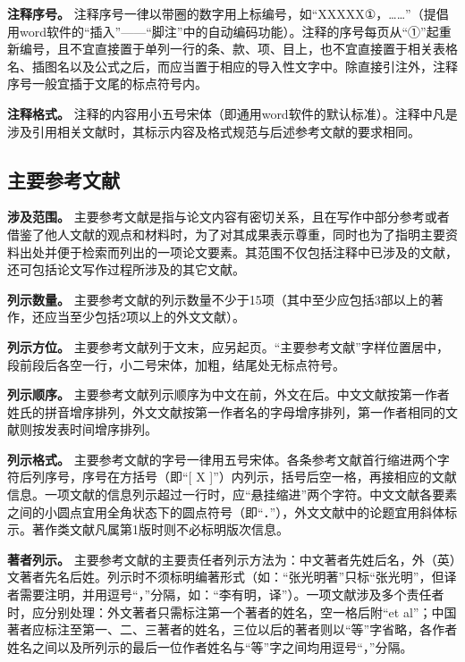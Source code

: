 \documentclass[doublesided]{Style/ucasthesis}%
\begin{document}
\textbf{注释序号。} 注释序号一律以带圈的数字用上标编号，如``XXXXX①，\ldots{}\ldots{}''（提倡用word软件的``插入''------``脚注''中的自动编码功能）。注释的序号每页从``①''起重新编号，且不宜直接置于单列一行的条、款、项、目上，也不宜直接置于相关表格名、插图名以及公式之后，而应当置于相应的导入性文字中。除直接引注外，注释序号一般宜插于文尾的标点符号内。

\textbf{注释格式。} 注释的内容用小五号宋体（即通用word软件的默认标准）。注释中凡是涉及引用相关文献时，其标示内容及格式规范与后述参考文献的要求相同。

\hypertarget{section-22}{%
\subsection{主要参考文献}\label{section-22}}

\textbf{涉及范围。} 主要参考文献是指与论文内容有密切关系，且在写作中部分参考或者借鉴了他人文献的观点和材料时，为了对其成果表示尊重，同时也为了指明主要资料出处并便于检索而列出的一项论文要素。其范围不仅包括注释中已涉及的文献，还可包括论文写作过程所涉及的其它文献。

\textbf{列示数量。} 主要参考文献的列示数量不少于15项（其中至少应包括3部以上的著作，还应当至少包括2项以上的外文文献）。

\textbf{列示方位。} 主要参考文献列于文末，应另起页。``主要参考文献''字样位置居中，段前段后各空一行，小二号宋体，加粗，结尾处无标点符号。

\textbf{列示顺序。} 主要参考文献列示顺序为中文在前，外文在后。中文文献按第一作者姓氏的拼音增序排列，外文文献按第一作者名的字母增序排列，第一作者相同的文献则按发表时间增序排列。

\textbf{列示格式。} 主要参考文献的字号一律用五号宋体。各条参考文献首行缩进两个字符后列序号，序号在方括号（即``{[} X {]}''）内列示，括号后空一格，再接相应的文献信息。一项文献的信息列示超过一行时，应``悬挂缩进''两个字符。中文文献各要素之间的小圆点宜用全角状态下的圆点符号（即``．''），外文文献中的论题宜用斜体标示。著作类文献凡属第1版时则不必标明版次信息。

\textbf{著者列示。} 主要参考文献的主要责任者列示方法为：中文著者先姓后名，外（英）文著者先名后姓。列示时不须标明编著形式（如：``张光明著''只标``张光明''，但译者需要注明，并用逗号``，''分隔，如：``李有明，译''）。一项文献涉及多个责任者时，应分别处理：外文著者只需标注第一个著者的姓名，空一格后附``et al''；中国著者应标注至第一、二、三著者的姓名，三位以后的著者则以``等''字省略，各作者姓名之间以及所列示的最后一位作者姓名与``等''字之间均用逗号``，''分隔。
\end{document}
